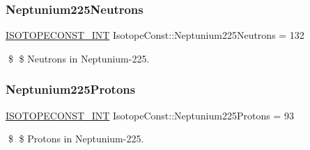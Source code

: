\subsubsection{\texorpdfstring{Neptunium225\+Neutrons}{Neptunium225Neutrons}}
{\footnotesize\ttfamily \mbox{\hyperlink{group___isotope_const-_macros_ga5f18360b3e99483a35c32d789e62621c}{I\+S\+O\+T\+O\+P\+E\+C\+O\+N\+S\+T\+\_\+\+I\+NT}} Isotope\+Const\+::\+Neptunium225\+Neutrons = 132}

\$ \$ Neutrons in Neptunium-\/225. \mbox{\label{group___isotope_const-_neptunium-_np225_ga0c0a31fcbc6f7e162c21d238d6b7a9e1}} 
\subsubsection{\texorpdfstring{Neptunium225\+Protons}{Neptunium225Protons}}
{\footnotesize\ttfamily \mbox{\hyperlink{group___isotope_const-_macros_ga5f18360b3e99483a35c32d789e62621c}{I\+S\+O\+T\+O\+P\+E\+C\+O\+N\+S\+T\+\_\+\+I\+NT}} Isotope\+Const\+::\+Neptunium225\+Protons = 93}

\$ \$ Protons in Neptunium-\/225. 
